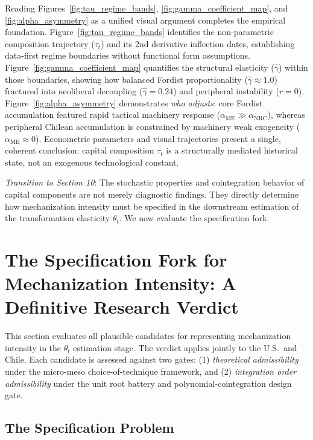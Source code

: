 \documentclass[11pt,a4paper]{article}
\begin{document}
Reading Figures~\ref{fig:tau_regime_bands}, \ref{fig:gamma_coefficient_map}, and \ref{fig:alpha_asymmetry} as a unified visual argument completes the empirical foundation. Figure~\ref{fig:tau_regime_bands} identifies the non-parametric composition trajectory ($\tau_t$) and its 2nd derivative inflection dates, establishing data-first regime boundaries without functional form assumptions. Figure~\ref{fig:gamma_coefficient_map} quantifies the structural elasticity ($\hat{\gamma}$) within those boundaries, showing how balanced Fordist proportionality ($\hat{\gamma} \approx 1.0$) fractured into neoliberal decoupling ($\hat{\gamma} = 0.24$) and peripheral instability ($r=0$). Figure~\ref{fig:alpha_asymmetry} demonstrates \textit{who adjusts}: core Fordist accumulation featured rapid tactical machinery response ($\alpha_{\text{ME}} \gg \alpha_{\text{NRC}}$), whereas peripheral Chilean accumulation is constrained by machinery weak exogeneity ($\alpha_{\text{ME}} \approx 0$). Econometric parameters and visual trajectories present a single, coherent conclusion: capital composition $\tau_t$ is a structurally mediated historical state, not an exogenous technological constant.

\textit{Transition to Section 10}: The stochastic properties and cointegration behavior of capital components are not merely diagnostic findings. They directly determine how mechanization intensity must be specified in the downstream estimation of the transformation elasticity $\theta_t$. We now evaluate the specification fork.

\FloatBarrier
\section{The Specification Fork for Mechanization Intensity: A Definitive Research Verdict}

This section evaluates all plausible candidates for representing mechanization intensity in the $\theta_t$ estimation stage. The verdict applies jointly to the U.S.\ and Chile. Each candidate is assessed against two gates: (1) \textit{theoretical admissibility} under the micro-meso choice-of-technique framework, and (2) \textit{integration order admissibility} under the unit root battery and polynomial-cointegration design gate.

\subsection{The Specification Problem}
\end{document}
